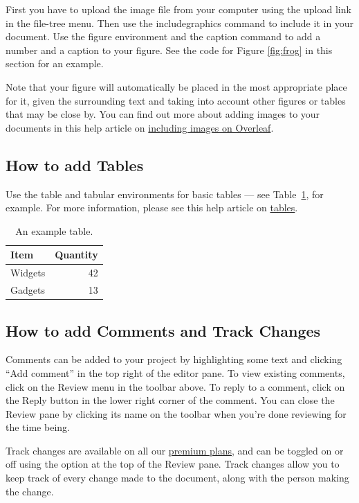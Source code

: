 \documentclass{article}
\begin{document}
First you have to upload the image file from your computer using the upload link in the file-tree menu. Then use the includegraphics command to include it in your document. Use the figure environment and the caption command to add a number and a caption to your figure. See the code for Figure \ref{fig:frog} in this section for an example.

Note that your figure will automatically be placed in the most appropriate place for it, given the surrounding text and taking into account other figures or tables that may be close by. You can find out more about adding images to your documents in this help article on \href{https://www.overleaf.com/learn/how-to/Including_images_on_Overleaf}{including images on Overleaf}.


\subsection{How to add Tables}

Use the table and tabular environments for basic tables --- see Table~\ref{tab:widgets}, for example. For more information, please see this help article on \href{https://www.overleaf.com/learn/latex/tables}{tables}. 

\begin{table}
\centering
\begin{tabular}{l|r}
Item & Quantity \\\hline
Widgets & 42 \\
Gadgets & 13
\end{tabular}
\caption{\label{tab:widgets}An example table.}
\end{table}

\subsection{How to add Comments and Track Changes}

Comments can be added to your project by highlighting some text and clicking ``Add comment'' in the top right of the editor pane. To view existing comments, click on the Review menu in the toolbar above. To reply to a comment, click on the Reply button in the lower right corner of the comment. You can close the Review pane by clicking its name on the toolbar when you're done reviewing for the time being.

Track changes are available on all our \href{https://www.overleaf.com/user/subscription/plans}{premium plans}, and can be toggled on or off using the option at the top of the Review pane. Track changes allow you to keep track of every change made to the document, along with the person making the change. 
\end{document}
